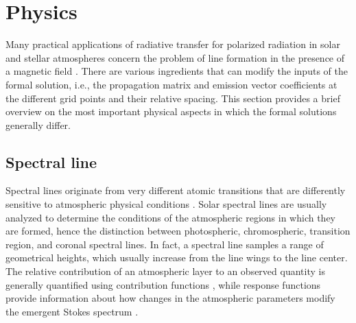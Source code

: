 \documentclass[iop,numberedappendix,twocolappendix,twocolumn]{emulateapj}
\begin{document}
\section{Physics}\label{sec:sec4}
%
Many practical applications of radiative transfer for polarized radiation in solar and stellar atmospheres concern the problem of line formation in the presence of a magnetic field \citep{landi_deglinnocenti+landolfi2004}.
There are various ingredients that 
can modify the inputs of the formal solution, i.e., the propagation matrix and emission vector coefficients at the different grid points and their relative spacing.
This section provides a brief overview on the most important physical aspects in which the formal solutions generally differ.
%
\vspace*{0.5cm}
\subsection{Spectral line}\label{subsec:4.4}
%
Spectral lines originate from very different atomic transitions that are differently sensitive to atmospheric physical conditions \citep{deltoro_iniesta2016}.
Solar spectral lines are usually analyzed to determine the conditions of the atmospheric regions in which they are formed,
hence the distinction between photospheric, chromospheric, transition region, and coronal spectral lines.
In fact, a spectral line samples a range of geometrical heights, which usually increase from the line wings to the line center.
The relative contribution of an atmospheric layer to an observed quantity is generally quantified using contribution functions \citep{magain1986,grossmann-doerth+al1988},
while response functions provide information about how changes in the atmospheric parameters modify the emergent Stokes spectrum \citep{grossmann-doerth+al1988,ruiz_cobo1992,bellot_rubio+al1998}.
\end{document}
